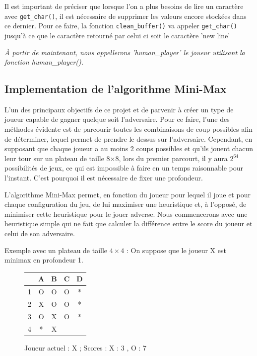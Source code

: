 \documentclass{report}
\begin{document}
Il est important de préciser que lorsque l'on a plus besoins de lire un caractère avec \texttt{get\_char()}, il est nécessaire de supprimer les valeurs encore stockées dans ce dernier. Pour ce faire, la fonction \texttt{clean\_buffer()} va appeler \texttt{get\_char()} jusqu'à ce que le caractère retourné par celui ci soit le caractère 'new line'\newline

\textit{À partir de maintenant, nous appellerons 'human\_player' le joueur utilisant la fonction human\_player().}


\subsection{Implementation de l'algorithme Mini-Max}
L'un des principaux objectifs de ce projet et de parvenir à créer un type de joueur capable de gagner quelque soit l'adversaire. Pour ce faire, l'une des méthodes évidente est de parcourir toutes les combinaisons de coup possibles afin de déterminer, lequel permet de prendre le dessus sur l'adversaire. Cependant, en supposant que chaque joueur a au moins 2 coups possibles et qu'ils jouent chacun leur tour sur un plateau de taille 8$\times$8, lors du premier parcourt, il y aura $2^{64}$ possibilités de jeux, ce qui est impossible à faire en un temps raisonnable pour l'instant. C'est pourquoi il est nécessaire de fixer une profondeur.

L'algorithme Mini-Max permet, en fonction du joueur pour lequel il joue et pour chaque configuration du jeu, de lui maximiser une heuristique et, à l'opposé, de minimiser cette heuristique pour le jouer adverse.
Nous commencerons avec une heuristique simple qui ne fait que calculer la différence entre le score du joueur et celui de son adversaire.
\newline

Exemple avec un plateau de taille $4\times4$ :
On suppose que le joueur X est minimax en profondeur 1.

\begin{figure}[!h]
\begin{center}
\renewcommand{\arraystretch} {1.5}
    \begin{tabular}{c|c|c|c|c|}
          &A & B & C & D \\
        \hline
        1 & O & O & O & *\\
        \hline
        2 & X & O & O & * \\
        \hline
        3 & O & X & O & * \\
        \hline
        4 & * & X &  &  \\
        \hline
    \end{tabular}

\end{center}
\begin{center}
    \label{Figure 1}
    \caption{Joueur actuel : X ; Scores : X : 3 , O : 7}
\end{center}
\end{figure}
\end{document}
